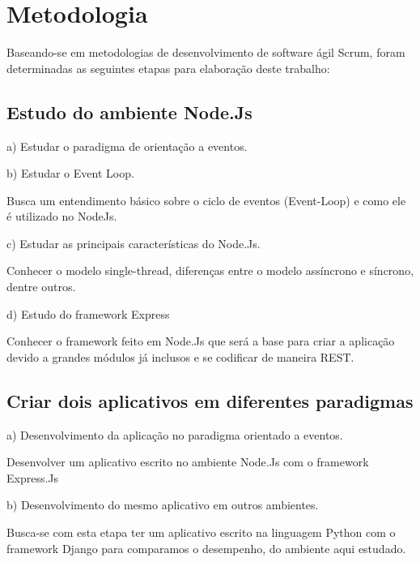 \chapter{Metodologia}
\label{metodologia}

\vspace{-1.9cm}

  Baseando-se em metodologias de desenvolvimento de software ágil Scrum, foram determinadas 
  as seguintes etapas para elaboração deste trabalho:


\section{Estudo do ambiente Node.Js}
  
  \begin{compactitem}
    \item[a)] Estudar o paradigma de orientação a eventos.
    \item[b)] Estudar o Event Loop.
    
    Busca um entendimento básico sobre o ciclo de eventos (Event-Loop) e como ele é utilizado no NodeJs.
    
    \item[c)] Estudar as principais características do Node.Js.
    
    Conhecer o modelo single-thread, diferenças entre o modelo assíncrono e síncrono, dentre outros.
    
    \item[d)] Estudo do framework Express
    
    Conhecer o framework feito em Node.Js que será a base para criar a 
    aplicação devido a grandes módulos já inclusos e se codificar de maneira \ac{REST}.

  \end{compactitem}

\section{Criar dois aplicativos em diferentes paradigmas}
  
  \begin{compactitem}
    \item[a)] Desenvolvimento da aplicação no paradigma orientado a eventos.
    
    Desenvolver um aplicativo escrito no ambiente Node.Js com o framework Express.Js
    
    \item[b)] Desenvolvimento do mesmo aplicativo em outros ambientes.
    
    Busca-se com esta etapa ter um aplicativo escrito na linguagem Python com o framework Django
    para comparamos o desempenho, do ambiente aqui estudado.
    
  \end{compactitem}

